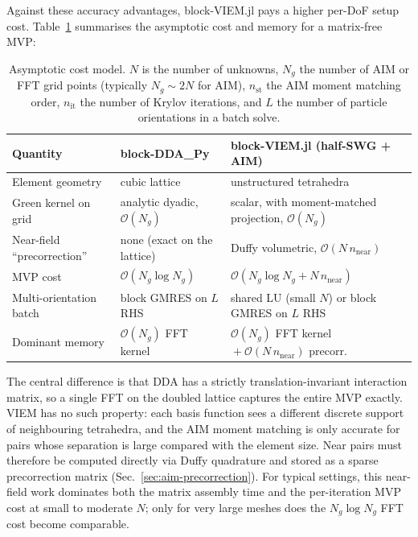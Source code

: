 \documentclass[11pt,a4paper]{article}
\begin{document}
Against these accuracy advantages, block-VIEM.jl pays a higher
per-DoF setup cost. Table~\ref{tab:viem-vs-dda-cost} summarises the
asymptotic cost and memory for a matrix-free MVP:

\begin{table}[h]
\centering
\caption{Asymptotic cost model. $N$ is the number of unknowns,
$N_g$ the number of AIM or FFT grid points (typically $N_g \sim 2N$
for AIM), $n_{\text{st}}$ the AIM moment matching order, $n_{\text{it}}$
the number of Krylov iterations, and $L$ the number of particle
orientations in a batch solve.}
\label{tab:viem-vs-dda-cost}
\small
\begin{tabular}{@{}l l p{45mm}@{}}
\toprule
Quantity & block-DDA\_Py & block-VIEM.jl (half-SWG + AIM) \\
\midrule
Element geometry
  & cubic lattice
  & unstructured tetrahedra \\
Green kernel on grid
  & analytic dyadic, $\mathcal{O}(N_g)$
  & scalar, with moment-matched projection, $\mathcal{O}(N_g)$ \\
Near-field ``precorrection''
  & none (exact on the lattice)
  & Duffy volumetric, $\mathcal{O}(N\,n_{\text{near}})$ \\
MVP cost
  & $\mathcal{O}(N_g \log N_g)$
  & $\mathcal{O}(N_g \log N_g + N\,n_{\text{near}})$ \\
Multi-orientation batch
  & block GMRES on $L$ RHS
  & shared LU (small $N$) or block GMRES on $L$ RHS \\
Dominant memory
  & $\mathcal{O}(N_g)$ FFT kernel
  & $\mathcal{O}(N_g)$ FFT kernel ${}+\mathcal{O}(N\,n_{\text{near}})$ precorr.\ \\
\bottomrule
\end{tabular}
\end{table}

The central difference is that DDA has a strictly translation-invariant
interaction matrix, so a single FFT on the doubled lattice captures the
entire MVP exactly. VIEM has no such property: each basis function sees
a different discrete support of neighbouring tetrahedra, and the AIM
moment matching is only accurate for pairs whose separation is large
compared with the element size. Near pairs must therefore be computed
directly via Duffy quadrature and stored as a sparse precorrection
matrix (Sec.~\ref{sec:aim-precorrection}). For typical settings, this
near-field work dominates both the matrix assembly time and the
per-iteration MVP cost at small to moderate $N$; only for very large
meshes does the $N_g \log N_g$ FFT cost become comparable.
\end{document}
